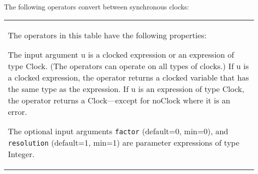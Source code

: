The following operators convert between synchronous clocks:
\begin{longtable}[]{|p{4cm}|p{11cm}|}
\hline \endhead
\multicolumn{2}{|p{15cm}|}{
The operators in this table have the following properties:

The input argument u is a clocked expression or an expression of type
Clock.  (The operators can operate on all types of clocks.)  If
u is a clocked expression, the operator returns a clocked variable that
has the same type as the expression. If u is an expression of type
Clock, the operator returns a Clock---except for noClock where it is an error.

The optional input arguments \lstinline!factor! (default=0, min=0), and \lstinline!resolution!
(default=1, min=1) are parameter expressions of type Integer.

}
\end{longtable}
